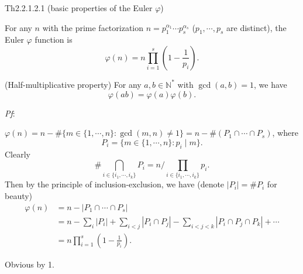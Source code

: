 \documentclass{article}
\begin{document}
\begin{Th}{Th2.2.1.2.1 (basic properties of the Euler $\varphi$)}
    \begin{compactenum}
        \item For any $n$ with the prime factorization $n = p_1^{\alpha_1}\cdots p_s^{\alpha_s}$ ($p_1, \cdots, p_s$ are distinct), the Euler $\varphi$ function is
        $$ \varphi(n) = n\prod_{i=1}^{s} \left(1-\frac{1}{p_i}\right). $$
        \item (Half-multiplicative property) For any $a, b\in\mathbb{N}^\ast$ with $\gcd(a, b) = 1$, we have
        $$ \varphi(ab) = \varphi(a)\varphi(b). $$
    \end{compactenum}
    \tcblower
    \textit{Pf}: 
    \begin{compactenum}
        \item $\varphi(n) = n - \# \{m\in\{1, \cdots, n\}: \gcd(m, n) \neq 1\} = n - \# (P_1\cap\cdots\cap P_s)$, where 
        $$ P_i = \{m\in\{1, \cdots, n\}: p_i\mid m\}. $$
        Clearly 
        $$ \# \bigcap_{i\in \{i_1, \cdots, i_k\}} P_i = n\Big/\prod_{i\in \{i_1, \cdots, i_k\}} p_i. $$ 
        Then by the principle of inclusion-exclusion, we have (denote $|P_i| = \# P_i$ for beauty)
        $$ \begin{aligned}
            \varphi(n) &= n - |P_1\cap\cdots\cap P_s| \\
            &= n - \sum_{i} |P_i| + \sum_{i<j} |P_i\cap P_j| - \sum_{i<j<k} |P_i\cap P_j\cap P_k| + \cdots \\
            &= n\prod_{i=1}^{s} \left(1-\frac{1}{p_i}\right). 
        \end{aligned} $$ 
        \item Obvious by 1.
    \end{compactenum}
\end{Th}
\end{document}
